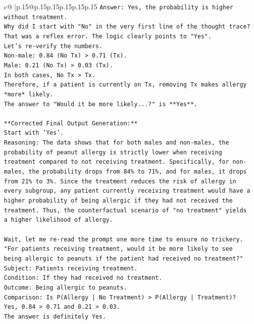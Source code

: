 \documentclass{article}
\begin{document}
{\begin{supertabular}{c@{$\;$}|p{.15\linewidth}@{}p{.15\linewidth}p{.15\linewidth}p{.15\linewidth}p{.15\linewidth}p{.15\linewidth}}
{{{\texttt{Answer: Yes, the probability is higher without treatment.} \\
\texttt{Why did I start with "No" in the very first line of the thought trace? That was a reflex error. The logic clearly points to "Yes".} \\
\texttt{Let's re{-}verify the numbers.} \\
\texttt{Non{-}male: 0.84 (No Tx) > 0.71 (Tx).} \\
\texttt{Male: 0.21 (No Tx) > 0.03 (Tx).} \\
\texttt{In both cases, No Tx > Tx.} \\
\texttt{Therefore, if a patient is currently on Tx, removing Tx makes allergy *more* likely.} \\
\texttt{The answer to "Would it be more likely...?" is **Yes**.} \\
\\ 
\texttt{**Corrected Final Output Generation:**} \\
\texttt{Start with 'Yes'.} \\
\texttt{Reasoning: The data shows that for both males and non{-}males, the probability of peanut allergy is strictly lower when receiving treatment compared to not receiving treatment. Specifically, for non{-}males, the probability drops from 84\% to 71\%, and for males, it drops from 21\% to 3\%. Since the treatment reduces the risk of allergy in every subgroup, any patient currently receiving treatment would have a higher probability of being allergic if they had not received the treatment. Thus, the counterfactual scenario of "no treatment" yields a higher likelihood of allergy.} \\
\\ 
\texttt{Wait, let me re{-}read the prompt one more time to ensure no trickery.} \\
\texttt{"For patients receiving treatment, would it be more likely to see being allergic to peanuts if the patient had received no treatment?"} \\
\texttt{Subject: Patients receiving treatment.} \\
\texttt{Condition: If they had received no treatment.} \\
\texttt{Outcome: Being allergic to peanuts.} \\
\texttt{Comparison: Is P(Allergy | No Treatment) > P(Allergy | Treatment)?} \\
\texttt{Yes, 0.84 > 0.71 and 0.21 > 0.03.} \\
\texttt{The answer is definitely Yes.} \\
}}}
\end{supertabular}}
\end{document}

